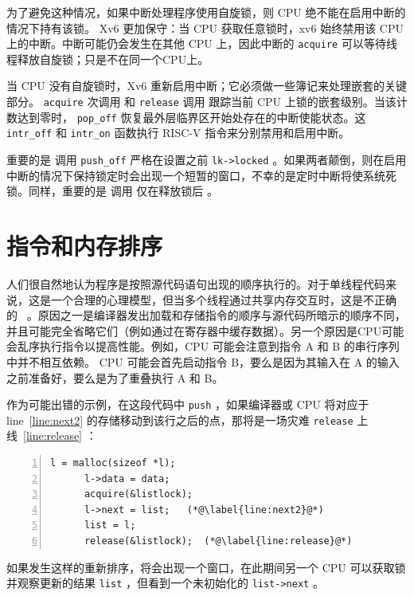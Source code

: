 为了避免这种情况，如果中断处理程序使用自旋锁，则 CPU 绝不能在启用中断的情况下持有该锁。 Xv6 更加保守：当 CPU 获取任意锁时，xv6 始终禁用该 CPU 上的中断。中断可能仍会发生在其他 CPU 上，因此中断的
    \lstinline{acquire}   可以等待线程释放自旋锁；只是不在同一个CPU上。  

当 CPU 没有自旋锁时，Xv6 重新启用中断；它必须做一些簿记来处理嵌套的关键部分。
    \lstinline{acquire}    次调用
        和
    \lstinline{release}    调用
        跟踪当前 CPU 上锁的嵌套级别。当该计数达到零时，
    \lstinline{pop_off}    恢复最外层临界区开始处存在的中断使能状态。这
    \lstinline{intr_off}    和
    \lstinline{intr_on}    函数执行 RISC-V 指令来分别禁用和启用中断。  

重要的是
        调用
    \lstinline{push_off}    严格在设置之前
    \lstinline{lk->locked}   
        。如果两者颠倒，则在启用中断的情况下保持锁定时会出现一个短暂的窗口，不幸的是定时中断将使系统死锁。同样，重要的是
        调用
        仅在释放锁后
        。
    \section{指令和内存排序  }     

人们很自然地认为程序是按照源代码语句出现的顺序执行的。对于单线程代码来说，这是一个合理的心理模型，但当多个线程通过共享内存交互时，这是不正确的~    \cite{riscv:user,boehm04}    。原因之一是编译器发出加载和存储指令的顺序与源代码所暗示的顺序不同，并且可能完全省略它们（例如通过在寄存器中缓存数据）。另一个原因是CPU可能会乱序执行指令以提高性能。例如，CPU 可能会注意到指令 A 和 B 的串行序列中并不相互依赖。 CPU 可能会首先启动指令 B，要么是因为其输入在 A 的输入之前准备好，要么是为了重叠执行 A 和 B。  

作为可能出错的示例，在这段代码中
    \lstinline{push}    ，如果编译器或 CPU 将对应于 line~\ref{line:next2}    的存储移动到该行之后的点，那将是一场灾难
    \lstinline{release}   上线~\ref{line:release}   ：
    \begin{lstlisting}[numbers=left,firstnumber=1]
      l = malloc(sizeof *l);
      l->data = data;
      acquire(&listlock);
      l->next = list;   (*@\label{line:next2}@*)
      list = l;      
      release(&listlock);  (*@\label{line:release}@*)
\end{lstlisting}    如果发生这样的重新排序，将会出现一个窗口，在此期间另一个 CPU 可以获取锁并观察更新的结果
    \lstinline{list}    ，但看到一个未初始化的
    \lstinline{list->next}    。  

